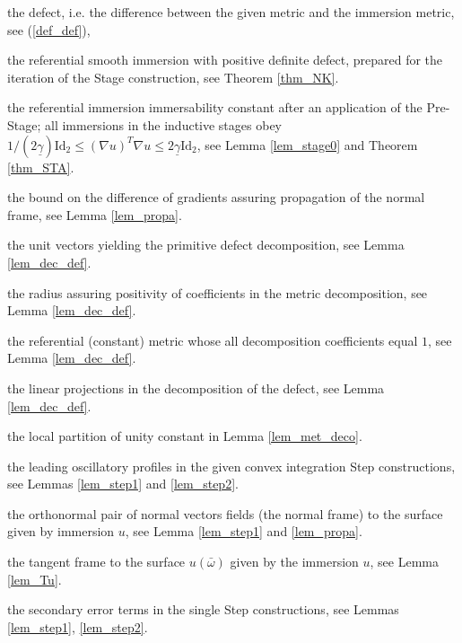 \documentclass[reqno,twoside,11pt]{amsart}
\newcommand{\Id}{\mathrm{Id}}
\numberwithin{equation}{section}
\theoremstyle{plain}
\theoremstyle{definition}
\begin{document}
\begin{description}[leftmargin=15mm]
\item[$\quad\mathcal{D}(g,u)=g-(\nabla u)^T\nabla u$] the defect,
  i.e. the difference between the given metric and the immersion metric,
  see (\ref{def_def}),
\item[$\quad\underline u$] the referential smooth immersion with
  positive definite defect, prepared for the iteration of the Stage
  construction, see Theorem \ref{thm_NK}.
\item[$\quad\underline \gamma$] the referential immersion
  immersability constant after
 an application of  the Pre-Stage; all immersions in the inductive stages obey
  $1/{(2\underline\gamma)}\Id_2\leq (\nabla u)^T\nabla u\leq
  2\underline\gamma \Id_2$, see Lemma \ref{lem_stage0} and Theorem \ref{thm_STA}.
\item[$\quad \rho_{\underline\gamma}$] the bound on the difference of
  gradients assuring propagation of the normal frame, see Lemma \ref{lem_propa}.
\item[$\quad\eta_1=e_1, \eta_2=\frac{e_1+e_2}{\sqrt2}, \eta_3=e_2$] the
  unit vectors yielding the primitive defect decomposition, see Lemma \ref{lem_dec_def}.
\item[$\quad r_0$]  the radius assuring positivity of
  coefficients in the metric decomposition, see Lemma \ref{lem_dec_def}.
\item[$\quad H_0=\sum_{i=1}^3\eta_i\otimes \eta_i$] the referential
  (constant) metric whose all decomposition coefficients equal $1$,
  see Lemma \ref{lem_dec_def}.
\item[$\quad\{\bar a_i\}_{i=1}^3$] the linear projections in the
  decomposition of the defect, see Lemma \ref{lem_dec_def}. 
\item[$\quad N_0$] the local partition of unity constant in Lemma \ref{lem_met_deco}. 
\item[$\quad\Gamma, \bar\Gamma$] the leading oscillatory profiles in the
  given convex integration Step constructions, see Lemmas \ref{lem_step1}
  and \ref{lem_step2}.
\item[$\quad E^1_u, E^2_u$] the orthonormal pair of normal vectors
  fields (the normal frame) to
  the surface given by immersion $u$, see Lemma \ref{lem_step1} and \ref{lem_propa}.
\item[$\quad T_u=(\nabla u)((\nabla u)^T\nabla u)^{-1}$] the tangent frame
  to the surface $u(\bar\omega)$ given by the immersion $u$, see Lemma \ref{lem_Tu}. 
\item[$\quad\mathcal{R}, \mathcal{R}_1, \mathcal{R}_2$] the secondary error
  terms in the single Step constructions, see Lemmas \ref{lem_step1}, \ref{lem_step2}. 

\end{description}
\end{document}
